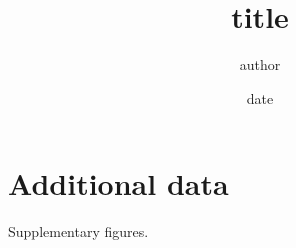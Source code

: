 \documentclass[11pt,a4paper,twoside,openright]{report}
\title{ {{title}} }
\author{ {{author}} }
\date{ {{date}} }
\begin{document}
\maketitle
\tableofcontents
\listoffigures




\appendix
\chapter{Additional data}
Supplementary figures.



\end{document}
